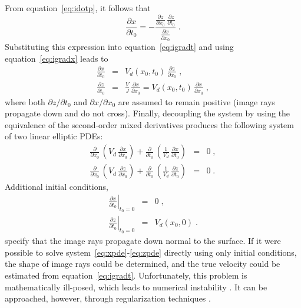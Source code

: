 \documentclass[manuscript]{geophysics}
\begin{document}
From equation~\ref{eq:idotp}, it follows that
\begin{equation}
  \label{eq:xt}
  \frac{\partial x}{\partial t_0} = - 
  \frac
  {\displaystyle \frac{\partial z}{\partial x_0}\,\frac{\partial z}{\partial t_0}}
  {\displaystyle \frac{\partial x}{\partial x_0}}\;.
\end{equation}
Substituting this expression into equation~\ref{eq:igradt} and
using equation~\ref{eq:igradx} leads to
\begin{eqnarray}
\label{eq:xt2}
\frac{\partial x}{\partial t_0} & = &
V_d(x_0,t_0)\,\frac{\partial z}{\partial x_0}\;, \\
\label{eq:zt2}
\frac{\partial z}{\partial t_0} & = & 
\frac{V}{J}\,\frac{\partial x}{\partial x_0} =
V_d(x_0,t_0)\,\frac{\partial x}{\partial x_0}\;, 
\end{eqnarray}
where both $\partial z/\partial t_0$ and $\partial x/\partial x_0$ are
assumed to remain positive (image rays propagate down and do not
cross). Finally, decoupling the system by using the equivalence of the
second-order mixed derivatives produces the following system of two
linear elliptic PDEs:
\begin{eqnarray}
\label{eq:xpde}
\frac{\partial}{\partial x_0}\,
\left(V_d\,\frac{\partial x}{\partial x_0}\right)
+ \frac{\partial}{\partial t_0}\,
\left(\frac{1}{V_d}\,\frac{\partial x}{\partial t_0}\right) & = & 0\;, \\
\label{eq:zpde}
\frac{\partial}{\partial x_0}\,
\left(V_d\,\frac{\partial z}{\partial x_0}\right)
+ \frac{\partial}{\partial t_0}\,
\left(\frac{1}{V_d}\,\frac{\partial z}{\partial t_0}\right) & = & 0\;.
\end{eqnarray}
Additional initial conditions,
\begin{eqnarray}
\label{eq:xbound}
\left. \frac{\partial x}{\partial t_0}\right|_{t_0=0} & = & 0 \;, \\
\label{eq:zbound}
\left. \frac{\partial z}{\partial t_0}\right|_{t_0=0} & = & V_d(x_0,0)\;. 
\end{eqnarray}
specify that the image rays propagate down normal to the surface. If
it were possible to solve system~\ref{eq:xpde}-\ref{eq:zpde}
directly using only initial conditions, the shape of image rays could
be determined, and the true velocity could be estimated from
equation~\ref{eq:igradt}. Unfortunately, this problem is
mathematically ill-posed, which leads to numerical
instability \cite[]{tikh}. It can be approached, however, through
regularization techniques \cite[]{jcp}.
\end{document}
